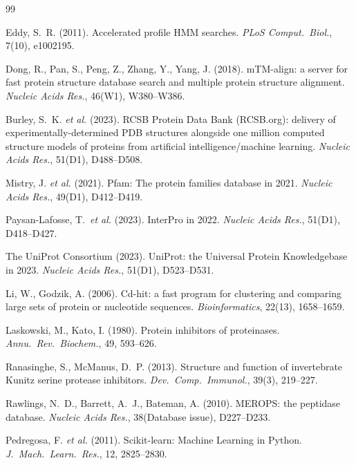 \documentclass[11pt,a4paper]{article}
\begin{document}

\begin{thebibliography}{99}

 Eddy, S.~R. (2011). Accelerated profile HMM searches. \textit{PLoS Comput.\ Biol.}, 7(10), e1002195.

 Dong, R., Pan, S., Peng, Z., Zhang, Y., Yang, J. (2018). mTM-align: a server for fast protein structure database search and multiple protein structure alignment. \textit{Nucleic Acids Res.}, 46(W1), W380--W386.

 Burley, S.~K. \emph{et al.} (2023). RCSB Protein Data Bank (RCSB.org): delivery of experimentally-determined PDB structures alongside one million computed structure models of proteins from artificial intelligence/machine learning. \textit{Nucleic Acids Res.}, 51(D1), D488--D508.

 Mistry, J. \emph{et al.} (2021). Pfam: The protein families database in 2021. \textit{Nucleic Acids Res.}, 49(D1), D412--D419.

 Paysan-Lafosse, T.\ \emph{et al.} (2023). InterPro in 2022. \textit{Nucleic Acids Res.}, 51(D1), D418--D427.

 The UniProt Consortium (2023). UniProt: the Universal Protein Knowledgebase in 2023. \textit{Nucleic Acids Res.}, 51(D1), D523--D531.

 Li, W., Godzik, A. (2006). Cd-hit: a fast program for clustering and comparing large sets of protein or nucleotide sequences. \textit{Bioinformatics}, 22(13), 1658--1659.

 Laskowski, M., Kato, I. (1980). Protein inhibitors of proteinases. \textit{Annu.\ Rev.\ Biochem.}, 49, 593--626.

 Ranasinghe, S., McManus, D.~P. (2013). Structure and function of invertebrate Kunitz serine protease inhibitors. \textit{Dev.\ Comp.\ Immunol.}, 39(3), 219--227.

 Rawlings, N.~D., Barrett, A.~J., Bateman, A. (2010). MEROPS: the peptidase database. \textit{Nucleic Acids Res.}, 38(Database issue), D227--D233.

 Pedregosa, F. \emph{et al.} (2011). Scikit-learn: Machine Learning in Python. \textit{J.\ Mach.\ Learn.\ Res.}, 12, 2825--2830.

\end{thebibliography}
\end{document}
